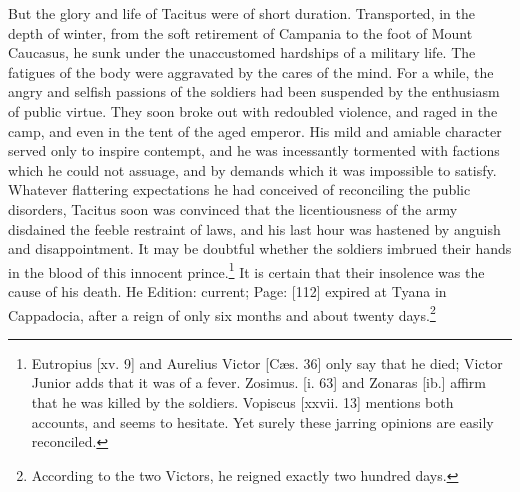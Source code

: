 But the glory and life of Tacitus were of short duration. Transported, in the depth of winter, from the soft retirement of Campania to the foot of Mount Caucasus, he sunk under the unaccustomed hardships of a military life. The fatigues of the body were aggravated by the cares of the mind. For a while, the angry and selfish passions of the soldiers had been suspended by the enthusiasm of public virtue. They soon broke out with redoubled violence, and raged in the camp, and even in the tent of the aged emperor. His mild and amiable character served only to inspire contempt, and he was incessantly tormented with factions which he could not assuage, and by demands which it was impossible to satisfy. Whatever flattering expectations he had conceived of reconciling the public disorders, Tacitus soon was convinced that the licentiousness of the army disdained the feeble restraint of laws, and his last hour was hastened by anguish and disappointment. It may be doubtful whether the soldiers imbrued their hands in the blood of this innocent prince.\footnote{Eutropius [xv. 9] and Aurelius Victor [Cæs. 36] only say that he died; Victor Junior adds that it was of a fever. Zosimus. [i. 63] and Zonaras [ib.] affirm that he was killed by the soldiers. Vopiscus [xxvii. 13] mentions both accounts, and seems to hesitate. Yet surely these jarring opinions are easily reconciled.} It is certain that their insolence was the cause of his death. He Edition: current; Page: [112] expired at Tyana in Cappadocia, after a reign of only six months and about twenty days.\footnote{According to the two Victors, he reigned exactly two hundred days.}

